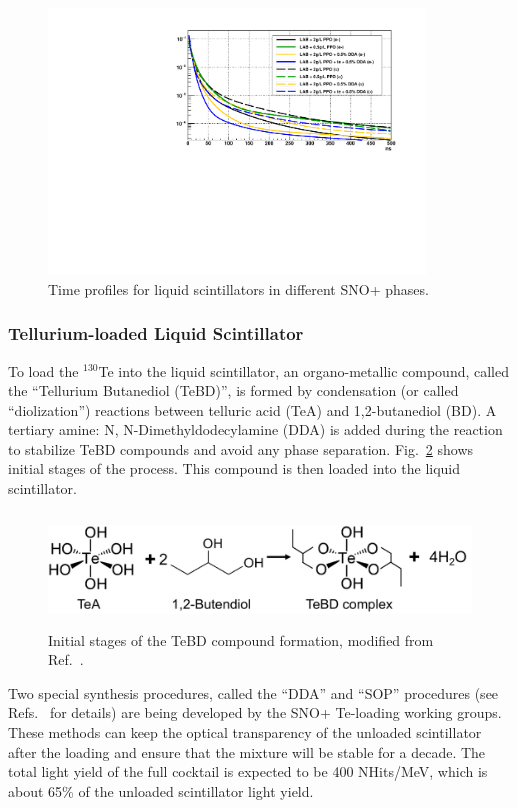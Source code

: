\begin{figure}[!htb]
	\centering
	\includegraphics[width=10cm]{plotAllTiming.pdf}
	\caption{Time profiles for liquid scintillators in different SNO+ phases.}
	\label{fig:allTiming}
\end{figure}

\subsubsection{Tellurium-loaded Liquid Scintillator}\label{sect:TeLS_SNO+}
To load the $^{130}$Te into the liquid scintillator, an organo-metallic compound, called the ``Tellurium Butanediol (TeBD)'', is formed by condensation (or called ``diolization'') reactions between telluric acid (TeA) and 1,2-butanediol (BD)\cite{Paton:2019kgy}. A tertiary amine: N, N-Dimethyldodecylamine (DDA) is added during the reaction to stabilize TeBD compounds and avoid any phase separation\cite{teLoadingPaper}. Fig.~\ref{fig:paton_te} shows initial stages of the process. This compound is then loaded into the liquid scintillator.
\begin{figure}[!htb]
	\centering
	\includegraphics[height = 3cm]{TeBD_process.png}
	\caption{Initial stages of the TeBD compound formation, modified from Ref.~\cite{Paton:2019kgy}.}
	\label{fig:paton_te}
\end{figure}

Two special synthesis procedures, called the ``DDA'' and ``SOP'' procedures (see Refs.~\cite{biller2017new,teDDA,DDAvsSOP} for details) are being developed by the SNO+ Te-loading working groups. These methods can keep the optical transparency of the unloaded scintillator after the loading and ensure that the mixture will be stable for a decade. The total light yield of the full cocktail is expected to be 400 NHits/MeV, which is about 65\% of the unloaded scintillator light yield.

